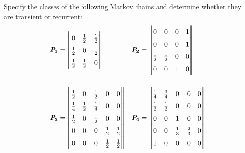 \begin{problem}{4.14}
  Specify the classes of the following Markov chains and determine whether they
  are transient or recurrent:
  \begin{align*}
    \renewcommand\arraystretch{1.5}
    \begin{array}{ll}
      \boldsymbol{P_1} =
      \begin{Vmatrix}
        0           & \frac{1}{2} & \frac{1}{2} \\
        \frac{1}{2} & 0           & \frac{1}{2} \\
        \frac{1}{2} & \frac{1}{2} & 0 \\
      \end{Vmatrix}
      &
      \boldsymbol{P_2} =
      \begin{Vmatrix}
        0           & 0           & 0           & 1 \\
        0           & 0           & 0           & 1 \\
        \frac{1}{2} & \frac{1}{2} & 0           & 0 \\
        0           & 0           & 1           & 0\\
      \end{Vmatrix} \\\\
      \boldsymbol{P_3} =
      \begin{Vmatrix}
        \frac{1}{2} & 0           & \frac{1}{2} & 0           & 0           \\
        \frac{1}{4} & \frac{1}{2} & \frac{1}{4} & 0           & 0           \\
        \frac{1}{2} & 0           & \frac{1}{2} & 0           & 0           \\
        0           & 0           & 0           & \frac{1}{2} & \frac{1}{2} \\
        0           & 0           & 0           & \frac{1}{2} & \frac{1}{2} \\
      \end{Vmatrix}
      &
      \boldsymbol{P_4} =
      \begin{Vmatrix}
        \frac{1}{4} & \frac{3}{4} & 0           & 0           & 0           \\
        \frac{1}{2} & \frac{1}{2} & 0           & 0           & 0           \\
        0           & 0           & 1           & 0           & 0           \\
        0           & 0           & \frac{1}{3} & \frac{2}{3} & 0           \\
        1           & 0           & 0           & 0           & 0           \\
      \end{Vmatrix}
    \end{array}
  \end{align*}
\end{problem}

